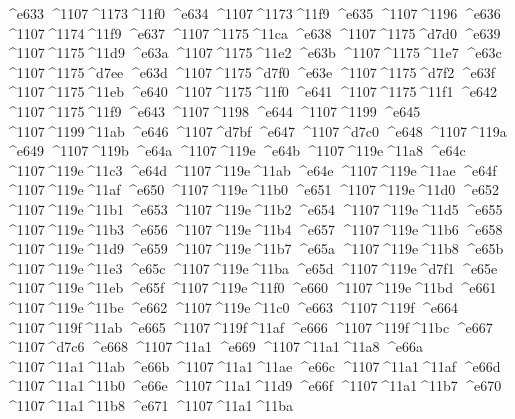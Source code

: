 \checkit ^^^^e633 ^^^^1107^^^^1173^^^^11f0
\checkit ^^^^e634 ^^^^1107^^^^1173^^^^11f9
\checkit ^^^^e635 ^^^^1107^^^^1196
\checkit ^^^^e636 ^^^^1107^^^^1174^^^^11f9
\checkit ^^^^e637 ^^^^1107^^^^1175^^^^11ca
\checkit ^^^^e638 ^^^^1107^^^^1175^^^^d7d0
\checkit ^^^^e639 ^^^^1107^^^^1175^^^^11d9
\checkit ^^^^e63a ^^^^1107^^^^1175^^^^11e2
\checkit ^^^^e63b ^^^^1107^^^^1175^^^^11e7
\checkit ^^^^e63c ^^^^1107^^^^1175^^^^d7ee
\checkit ^^^^e63d ^^^^1107^^^^1175^^^^d7f0
\checkit ^^^^e63e ^^^^1107^^^^1175^^^^d7f2
\checkit ^^^^e63f ^^^^1107^^^^1175^^^^11eb
\checkit ^^^^e640 ^^^^1107^^^^1175^^^^11f0
\checkit ^^^^e641 ^^^^1107^^^^1175^^^^11f1
\checkit ^^^^e642 ^^^^1107^^^^1175^^^^11f9
\checkit ^^^^e643 ^^^^1107^^^^1198
\checkit ^^^^e644 ^^^^1107^^^^1199
\checkit ^^^^e645 ^^^^1107^^^^1199^^^^11ab
\checkit ^^^^e646 ^^^^1107^^^^d7bf
\checkit ^^^^e647 ^^^^1107^^^^d7c0
\checkit ^^^^e648 ^^^^1107^^^^119a
\checkit ^^^^e649 ^^^^1107^^^^119b
\checkit ^^^^e64a ^^^^1107^^^^119e
\checkit ^^^^e64b ^^^^1107^^^^119e^^^^11a8
\checkit ^^^^e64c ^^^^1107^^^^119e^^^^11c3
\checkit ^^^^e64d ^^^^1107^^^^119e^^^^11ab
\checkit ^^^^e64e ^^^^1107^^^^119e^^^^11ae
\checkit ^^^^e64f ^^^^1107^^^^119e^^^^11af
\checkit ^^^^e650 ^^^^1107^^^^119e^^^^11b0
\checkit ^^^^e651 ^^^^1107^^^^119e^^^^11d0
\checkit ^^^^e652 ^^^^1107^^^^119e^^^^11b1
\checkit ^^^^e653 ^^^^1107^^^^119e^^^^11b2
\checkit ^^^^e654 ^^^^1107^^^^119e^^^^11d5
\checkit ^^^^e655 ^^^^1107^^^^119e^^^^11b3
\checkit ^^^^e656 ^^^^1107^^^^119e^^^^11b4
\checkit ^^^^e657 ^^^^1107^^^^119e^^^^11b6
\checkit ^^^^e658 ^^^^1107^^^^119e^^^^11d9
\checkit ^^^^e659 ^^^^1107^^^^119e^^^^11b7
\checkit ^^^^e65a ^^^^1107^^^^119e^^^^11b8
\checkit ^^^^e65b ^^^^1107^^^^119e^^^^11e3
\checkit ^^^^e65c ^^^^1107^^^^119e^^^^11ba
\checkit ^^^^e65d ^^^^1107^^^^119e^^^^d7f1
\checkit ^^^^e65e ^^^^1107^^^^119e^^^^11eb
\checkit ^^^^e65f ^^^^1107^^^^119e^^^^11f0
\checkit ^^^^e660 ^^^^1107^^^^119e^^^^11bd
\checkit ^^^^e661 ^^^^1107^^^^119e^^^^11be
\checkit ^^^^e662 ^^^^1107^^^^119e^^^^11c0
\checkit ^^^^e663 ^^^^1107^^^^119f
\checkit ^^^^e664 ^^^^1107^^^^119f^^^^11ab
\checkit ^^^^e665 ^^^^1107^^^^119f^^^^11af
\checkit ^^^^e666 ^^^^1107^^^^119f^^^^11bc
\checkit ^^^^e667 ^^^^1107^^^^d7c6
\checkit ^^^^e668 ^^^^1107^^^^11a1
\checkit ^^^^e669 ^^^^1107^^^^11a1^^^^11a8
\checkit ^^^^e66a ^^^^1107^^^^11a1^^^^11ab
\checkit ^^^^e66b ^^^^1107^^^^11a1^^^^11ae
\checkit ^^^^e66c ^^^^1107^^^^11a1^^^^11af
\checkit ^^^^e66d ^^^^1107^^^^11a1^^^^11b0
\checkit ^^^^e66e ^^^^1107^^^^11a1^^^^11d9
\checkit ^^^^e66f ^^^^1107^^^^11a1^^^^11b7
\checkit ^^^^e670 ^^^^1107^^^^11a1^^^^11b8
\checkit ^^^^e671 ^^^^1107^^^^11a1^^^^11ba
